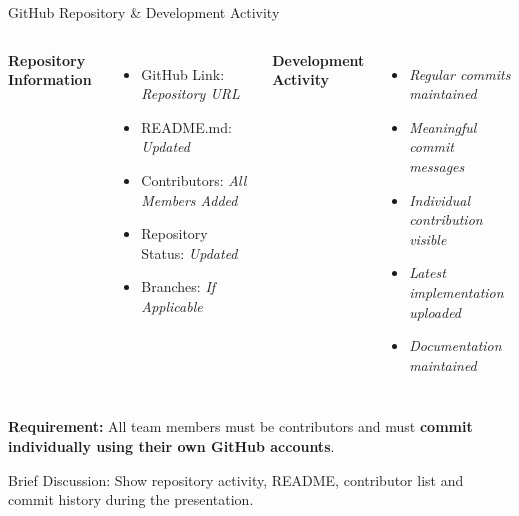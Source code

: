 \documentclass[aspectratio=169,11pt]{beamer}
\newcommand{\smallnote}[1]{%
\vspace{0.08cm}
{\scriptsize\color{GEUGrey}#1}
}
\newcommand{\placeholder}[1]{%
\textit{\color{GEUGrey}#1}
}
\begin{document}
\begin{frame}{GitHub Repository \& Development Activity}

\begin{columns}[T,totalwidth=\textwidth]


\textbf{\color{GEUBlue}Repository Information}

\begin{itemize}\itemsep3pt
\item GitHub Link: \placeholder{Repository URL}
\item README.md: \placeholder{Updated}
\item Contributors: \placeholder{All Members Added}
\item Repository Status: \placeholder{Updated}
\item Branches: \placeholder{If Applicable}
\end{itemize}


\textbf{\color{GEUBlue}Development Activity}

\begin{itemize}\itemsep3pt
\item \placeholder{Regular commits maintained}
\item \placeholder{Meaningful commit messages}
\item \placeholder{Individual contribution visible}
\item \placeholder{Latest implementation uploaded}
\item \placeholder{Documentation maintained}
\end{itemize}

\end{columns}

\vfill

\begin{center}
\colorbox{GEULightBlue}{
\parbox{.88\textwidth}{
\centering
\textbf{Requirement:}
All team members must be contributors and must
\textbf{commit individually using their own GitHub accounts}.
}}
\end{center}

\smallnote{
Brief Discussion: Show repository activity, README, contributor list
and commit history during the presentation.
}

\end{frame}
\end{document}

